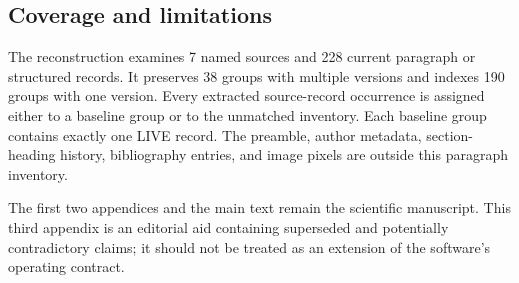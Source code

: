 \documentclass[11pt]{article}
\begin{document}
\subsection{Coverage and limitations}

The reconstruction examines 7 named sources and 228 current paragraph or structured records. It preserves 38 groups with multiple versions and indexes 190 groups with one version. Every extracted source-record occurrence is assigned either to a baseline group or to the unmatched inventory. Each baseline group contains exactly one LIVE record. The preamble, author metadata, section-heading history, bibliography entries, and image pixels are outside this paragraph inventory.

The first two appendices and the main text remain the scientific manuscript. This third appendix is an editorial aid containing superseded and potentially contradictory claims; it should not be treated as an extension of the software's operating contract.

\endgroup
\clearpage
\end{document}

